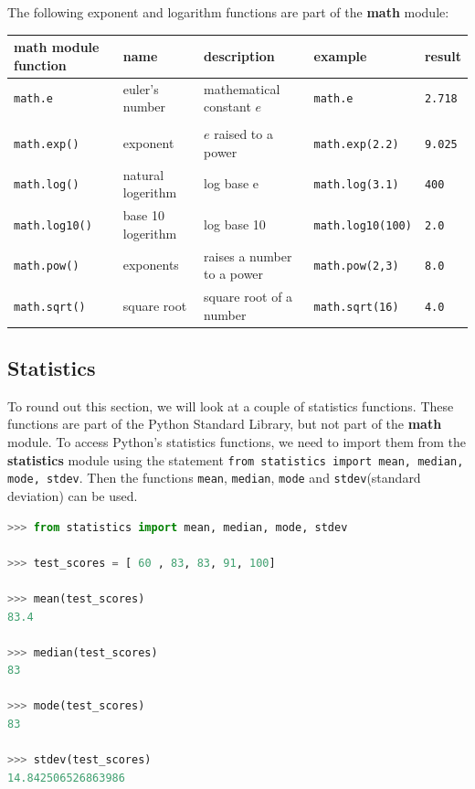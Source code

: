 \documentclass{book}
\begin{document}
The following exponent and logarithm functions are part of the
\textbf{math} module:

\begin{longtable}[]{@{}lllll@{}}
\toprule
math module function & name & description & example &
result\tabularnewline
\midrule
\endhead
\lstinline!math.e! & euler's number & mathematical constant \(e\) &
\lstinline!math.e! & \lstinline!2.718!\tabularnewline
& & & &\tabularnewline
\lstinline!math.exp()! & exponent & \(e\) raised to a power &
\lstinline!math.exp(2.2)! & \lstinline!9.025!\tabularnewline
\lstinline!math.log()! & natural logerithm & log base e &
\lstinline!math.log(3.1)! & \lstinline!400!\tabularnewline
\lstinline!math.log10()! & base 10 logerithm & log base 10 &
\lstinline!math.log10(100)! & \lstinline!2.0!\tabularnewline
\lstinline!math.pow()! & exponents & raises a number to a power &
\lstinline!math.pow(2,3)! & \lstinline!8.0!\tabularnewline
\lstinline!math.sqrt()! & square root & square root of a number &
\lstinline!math.sqrt(16)! & \lstinline!4.0!\tabularnewline
\bottomrule
\end{longtable}
    




    
        \subsection{Statistics}\label{statistics}

To round out this section, we will look at a couple of statistics
functions. These functions are part of the Python Standard Library, but
not part of the \textbf{math} module. To access Python's statistics
functions, we need to import them from the \textbf{statistics} module
using the statement
\lstinline!from statistics import mean, median, mode, stdev!. Then the
functions \lstinline!mean!, \lstinline!median!, \lstinline!mode! and
\lstinline!stdev!(standard deviation) can be used.

\begin{lstlisting}[language=Python]
>>> from statistics import mean, median, mode, stdev
    
>>> test_scores = [ 60 , 83, 83, 91, 100]
    
>>> mean(test_scores)
83.4

>>> median(test_scores)
83

>>> mode(test_scores)
83
    
>>> stdev(test_scores)
14.842506526863986 
\end{lstlisting}
\end{document}
